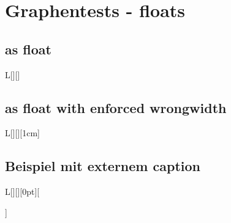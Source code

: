 \documentclass[Typ=CUSTOMLAYOUT,Vorlesung=LAII]{Lilly}
\begin{document}
\clearpage
\section{Graphentests - floats}
    \subsection{as float}
    \begin{wgraph}{L}[][]
        \plotline[Veronica]{\x*\x}
    \end{wgraph}\lipsum[6-8]

\subsection{as float with enforced wrongwidth}
    \begin{wgraph}{L}[][][1cm]
        \plotline[Amber]{\x*\x}
    \end{wgraph}\lipsum[6-8]

\subsection{Beispiel mit externem caption}
    \begin{wgraph}{L}[][][0pt][\caption{Wichtiger Graph}]
        \plotline[Aureolin]{\x*\x}
    \end{wgraph}\lipsum[6-8]
\end{document}
